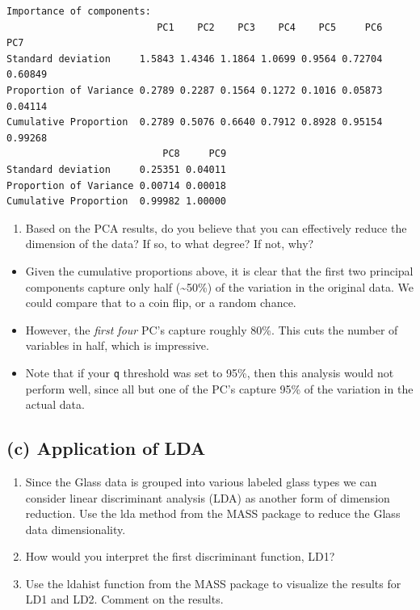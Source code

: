 \documentclass[
  letterpaper,
  DIV=11,
  numbers=noendperiod]{scrartcl}
\providecommand{\tightlist}{%
  \setlength{\itemsep}{0pt}\setlength{\parskip}{0pt}}\usepackage{longtable,booktabs,array}
\begin{document}
\begin{verbatim}
Importance of components:
                          PC1    PC2    PC3    PC4    PC5     PC6     PC7
Standard deviation     1.5843 1.4346 1.1864 1.0699 0.9564 0.72704 0.60849
Proportion of Variance 0.2789 0.2287 0.1564 0.1272 0.1016 0.05873 0.04114
Cumulative Proportion  0.2789 0.5076 0.6640 0.7912 0.8928 0.95154 0.99268
                           PC8     PC9
Standard deviation     0.25351 0.04011
Proportion of Variance 0.00714 0.00018
Cumulative Proportion  0.99982 1.00000
\end{verbatim}

\begin{enumerate}
\def\labelenumi{\roman{enumi}.}
\setcounter{enumi}{3}
\tightlist
\item
  Based on the PCA results, do you believe that you can effectively
  reduce the dimension of the data? If so, to what degree? If not, why?
\end{enumerate}

\begin{itemize}
\item
  Given the cumulative proportions above, it is clear that the first two
  principal components capture only half (\textasciitilde50\%) of the
  variation in the original data. We could compare that to a coin flip,
  or a random chance.
\item
  However, the \emph{first four} PC's capture roughly 80\%. This cuts
  the number of variables in half, which is impressive.
\item
  Note that if your \texttt{q} threshold was set to 95\%, then this
  analysis would not perform well, since all but one of the PC's capture
  95\% of the variation in the actual data.
\end{itemize}

\newpage

\hypertarget{c-application-of-lda}{%
\subsection{(c) Application of LDA}\label{c-application-of-lda}}

\begin{enumerate}
\def\labelenumi{\roman{enumi}.}
\item
  Since the Glass data is grouped into various labeled glass types we
  can consider linear discriminant analysis (LDA) as another form of
  dimension reduction. Use the lda method from the MASS package to
  reduce the Glass data dimensionality.
\item
  How would you interpret the first discriminant function, LD1?
\item
  Use the ldahist function from the MASS package to visualize the
  results for LD1 and LD2. Comment on the results.
\end{enumerate}
\end{document}
